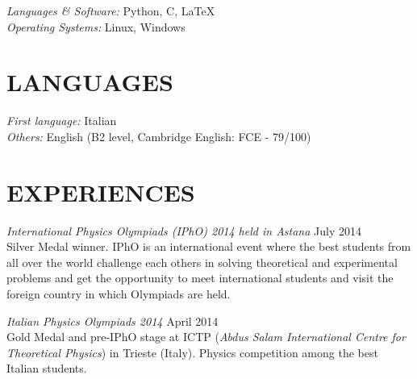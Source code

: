 \documentclass[margin, 10pt]{res} %
\begin{document}
\begin{resume}

{\sl Languages \& Software:} 
Python, C, \LaTeX \\
{\sl Operating Systems:} Linux, Windows


\section{LANGUAGES} 

{\sl First language:} Italian\\
{\sl Others:} English (B2 level, Cambridge English: FCE - 79/100)


 
\section{EXPERIENCES}



{\sl International Physics Olympiads (IPhO) 2014 held in Astana} \hfill July 2014\\
Silver Medal winner. IPhO is an international event where the best students from all over the world challenge each others in solving theoretical and experimental problems and get the opportunity to meet international students and visit the foreign country in which Olympiads are held.

{\sl Italian Physics Olympiads 2014} \hfill April 2014\\
Gold Medal and pre-IPhO stage at ICTP (\textit{Abdus Salam International Centre for Theoretical Physics}) in Trieste (Italy). Physics competition among the best Italian students. 


\end{resume}
\end{document}
